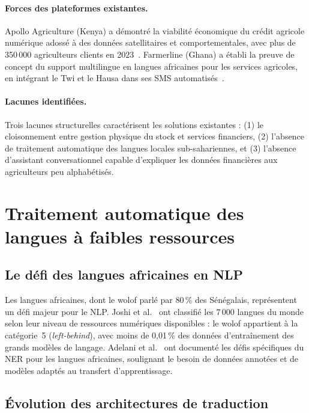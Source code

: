 \documentclass[12pt,a4paper,twoside]{report}
\begin{document}
\paragraph{Forces des plateformes existantes.}
Apollo Agriculture (Kenya) a démontré la viabilité économique du crédit
agricole numérique adossé à des données satellitaires et comportementales,
avec plus de 350\,000 agriculteurs clients en 2023~\cite{fao2021ml}.
Farmerline (Ghana) a établi la preuve de concept du support multilingue
en langues africaines pour les services agricoles, en intégrant le Twi
et le Hausa dans ses SMS automatisés~\cite{nakasone2016ict}.

\paragraph{Lacunes identifiées.}
Trois lacunes structurelles caractérisent les solutions existantes :
(1) le cloisonnement entre gestion physique du stock et services financiers,
(2) l'absence de traitement automatique des langues locales sub-sahariennes,
et (3) l'absence d'assistant conversationnel capable d'expliquer les
données financières aux agriculteurs peu alphabétisés.

\section{Traitement automatique des langues à faibles ressources}

\subsection{Le défi des langues africaines en NLP}

Les langues africaines, dont le wolof parlé par 80\,\% des Sénégalais,
représentent un défi majeur pour le NLP. Joshi et al.~\cite{joshi2020state}
ont classifié les 7\,000 langues du monde selon leur niveau de ressources
numériques disponibles : le wolof appartient à la catégorie~5 (\emph{left-behind}),
avec moins de 0,01\,\% des données d'entraînement des grands modèles de langage.
Adelani et al.~\cite{adelani2022masakhaner} ont documenté les défis spécifiques
du NER pour les langues africaines, soulignant le besoin de données annotées et
de modèles adaptés au transfert d'apprentissage.

\subsection{Évolution des architectures de traduction}
\end{document}
